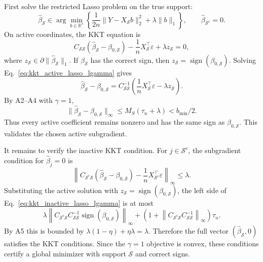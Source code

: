 \documentclass{article}
\begin{document}
First solve the restricted Lasso problem on the true support:
\begin{equation}
\widehat\beta_{\mathcal S}
\in
\arg\min_{b\in\mathbb R^s}
\left\{
\frac{1}{2n}\|Y-X_{\mathcal S}b\|_2^2+
\lambda\|b\|_1
\right\},
\qquad
\widehat\beta_{\mathcal S^c}=0 .
\end{equation}
On active coordinates, the KKT equation is
\begin{equation}
C_{\mathcal S\mathcal S}(\widehat\beta_{\mathcal S}-\beta_{0,\mathcal S})
-
\frac{1}{n}X_{\mathcal S}^\top\varepsilon
+
\lambda z_{\mathcal S}=0,
\label{eq:kkt_active_lasso_lgamma}
\end{equation}
where \(z_{\mathcal S}\in\partial\|\widehat\beta_{\mathcal S}\|_1\). If \(\widehat\beta_{\mathcal S}\) has the correct sign, then \(z_{\mathcal S}=\operatorname{sign}(\beta_{0,\mathcal S})\). Solving Eq.~\eqref{eq:kkt_active_lasso_lgamma} gives
\begin{equation}
\widehat\beta_{\mathcal S}-\beta_{0,\mathcal S}
=
C_{\mathcal S\mathcal S}^{-1}
\left(
\frac{1}{n}X_{\mathcal S}^\top\varepsilon-
\lambda z_{\mathcal S}
\right).
\end{equation}
By A2--A4 with \(\gamma=1\),
\begin{equation}
\|\widehat\beta_{\mathcal S}-\beta_{0,\mathcal S}\|_\infty
\le M_S(\tau_n+\lambda)<b_{\min}/2 .
\end{equation}
Thus every active coefficient remains nonzero and has the same sign as \(\beta_{0,\mathcal S}\). This validates the chosen active subgradient.

It remains to verify the inactive KKT condition. For \(j\in\mathcal S^c\), the subgradient condition for \(\widehat\beta_j=0\) is
\begin{equation}
\left\|
C_{\mathcal S^c\mathcal S}(\widehat\beta_{\mathcal S}-\beta_{0,\mathcal S})
-
\frac{1}{n}X_{\mathcal S^c}^\top\varepsilon
\right\|_\infty
\le\lambda .
\label{eq:kkt_inactive_lasso_lgamma}
\end{equation}
Substituting the active solution with \(z_{\mathcal S}=\operatorname{sign}(\beta_{0,\mathcal S})\), the left side of Eq.~\eqref{eq:kkt_inactive_lasso_lgamma} is at most
\begin{equation}
\lambda
\left\|
C_{\mathcal S^c\mathcal S}C_{\mathcal S\mathcal S}^{-1}
\operatorname{sign}(\beta_{0,\mathcal S})
\right\|_\infty
+
\left(1+
\left\|C_{\mathcal S^c\mathcal S}C_{\mathcal S\mathcal S}^{-1}\right\|_\infty
\right)\tau_n .
\end{equation}
By A5 this is bounded by \(\lambda(1-\eta)+\eta\lambda=\lambda\). Therefore the full vector \((\widehat\beta_{\mathcal S},0)\) satisfies the KKT conditions. Since the \(\gamma=1\) objective is convex, these conditions certify a global minimizer with support \(\mathcal S\) and correct signs.
\end{document}

